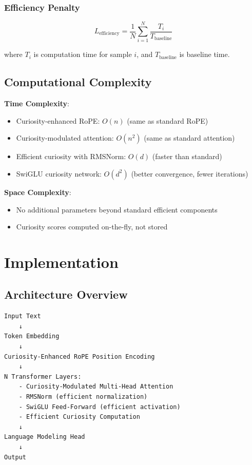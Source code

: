 \documentclass{IEEEtran}
\begin{document}
\subsubsection{Efficiency Penalty}

\begin{equation}
L_{\text{efficiency}} = \frac{1}{N} \sum_{i=1}^N \frac{T_i}{T_{\text{baseline}}}
\end{equation}

where $T_i$ is computation time for sample $i$, and $T_{\text{baseline}}$ is baseline time.

\subsection{Computational Complexity}

\textbf{Time Complexity}:
\begin{itemize}
    \item Curiosity-enhanced RoPE: $O(n)$ (same as standard RoPE)
    \item Curiosity-modulated attention: $O(n^2)$ (same as standard attention)
    \item Efficient curiosity with RMSNorm: $O(d)$ (faster than standard)
    \item SwiGLU curiosity network: $O(d^2)$ (better convergence, fewer iterations)
\end{itemize}

\textbf{Space Complexity}:
\begin{itemize}
    \item No additional parameters beyond standard efficient components
    \item Curiosity scores computed on-the-fly, not stored
\end{itemize}

\section{Implementation}

\subsection{Architecture Overview}

\begin{verbatim}
Input Text
    ↓
Token Embedding
    ↓
Curiosity-Enhanced RoPE Position Encoding
    ↓
N Transformer Layers:
    - Curiosity-Modulated Multi-Head Attention
    - RMSNorm (efficient normalization)
    - SwiGLU Feed-Forward (efficient activation)
    - Efficient Curiosity Computation
    ↓
Language Modeling Head
    ↓
Output
\end{verbatim}
\end{document}
